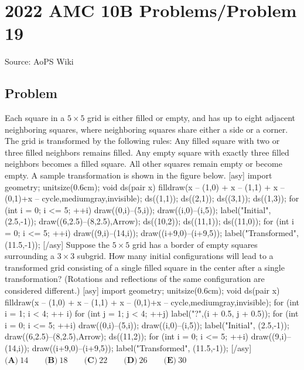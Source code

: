 \documentclass[12pt]{article}
\begin{document}
\section*{{2022 AMC 10B Problems/Problem 19}}
Source: AoPS Wiki

\subsection*{Problem}
Each square in a $5 \times 5$ grid is either filled or empty, and has up to eight adjacent neighboring squares, where neighboring squares share either a side or a corner. The grid is transformed by the following rules: Any filled square with two or three filled neighbors remains filled. Any empty square with exactly three filled neighbors becomes a filled square. All other squares remain empty or become empty. A sample transformation is shown in the figure below. [asy] import geometry; unitsize(0.6cm); void ds(pair x) { filldraw(x -- (1,0) + x -- (1,1) + x -- (0,1)+x -- cycle,mediumgray,invisible); } ds((1,1)); ds((2,1)); ds((3,1)); ds((1,3)); for (int i = 0; i <= 5; ++i) { draw((0,i)--(5,i)); draw((i,0)--(i,5)); } label("Initial", (2.5,-1)); draw((6,2.5)--(8,2.5),Arrow); ds((10,2)); ds((11,1)); ds((11,0)); for (int i = 0; i <= 5; ++i) { draw((9,i)--(14,i)); draw((i+9,0)--(i+9,5)); } label("Transformed", (11.5,-1)); [/asy] Suppose the $5 \times 5$ grid has a border of empty squares surrounding a $3 \times 3$ subgrid. How many initial configurations will lead to a transformed grid consisting of a single filled square in the center after a single transformation? (Rotations and reflections of the same configuration are considered different.) [asy] import geometry; unitsize(0.6cm); void ds(pair x) { filldraw(x -- (1,0) + x -- (1,1) + x -- (0,1)+x -- cycle,mediumgray,invisible); } for (int i = 1; i < 4; ++ i) { for (int j = 1; j < 4; ++j) { label("?",(i + 0.5, j + 0.5)); } } for (int i = 0; i <= 5; ++i) { draw((0,i)--(5,i)); draw((i,0)--(i,5)); } label("Initial", (2.5,-1)); draw((6,2.5)--(8,2.5),Arrow); ds((11,2)); for (int i = 0; i <= 5; ++i) { draw((9,i)--(14,i)); draw((i+9,0)--(i+9,5)); } label("Transformed", (11.5,-1)); [/asy] $\textbf{(A)}\ 14 \qquad\textbf{(B)}\ 18 \qquad\textbf{(C)}\ 22 \qquad\textbf{(D)}\ 26 \qquad\textbf{(E)}\ 30$
\end{document}
